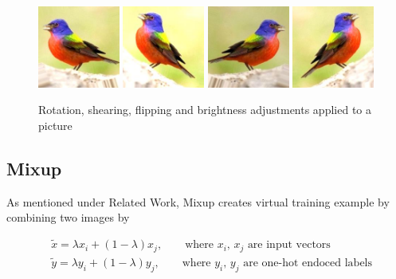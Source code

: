 \documentclass{article}
\begin{document}
\begin{figure}[h]
\includegraphics[width=0.24\textwidth]{aug1.jpeg}
\includegraphics[width=0.24\textwidth]{aug2.jpeg}
\includegraphics[width=0.24\textwidth]{aug3.jpeg}
\includegraphics[width=0.24\textwidth]{aug4.jpeg}
\caption{Rotation, shearing, flipping and brightness adjustments applied to a picture}
\end{figure}


\subsection{Mixup}

As mentioned under Related Work, Mixup creates virtual training example by combining two images by 

\begin{align*}
&\tilde{x} = \lambda x_i + (1-\lambda) x_j, \qquad \text{where $x_i$, $x_j$ are input vectors} \\
&\tilde{y} = \lambda y_i + (1-\lambda) y_j, \qquad \text{where $y_i$, $y_j$ are one-hot endoced labels}
\end{align*}
\end{document}
